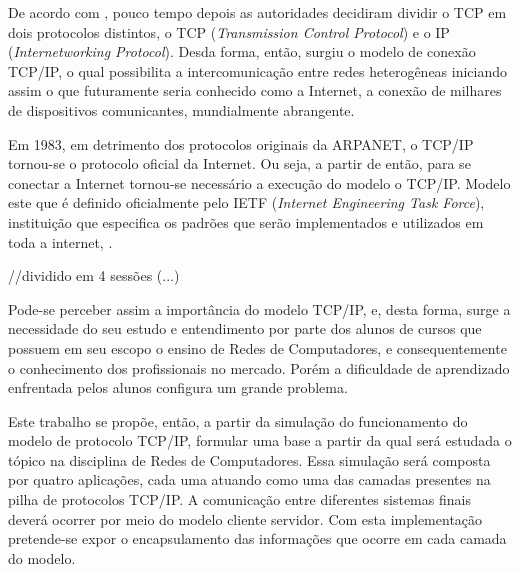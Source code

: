 De acordo com \cite{Forouzan}, pouco tempo depois as autoridades decidiram dividir o TCP em dois protocolos distintos, o TCP (\textit{Transmission Control Protocol}) e o IP (\textit{Internetworking Protocol}). Desda forma, então, surgiu o modelo de conexão TCP/IP, o qual possibilita a intercomunicação entre redes heterogêneas iniciando assim o que futuramente seria conhecido como a Internet, a conexão de milhares de dispositivos comunicantes, mundialmente abrangente.

Em 1983, em detrimento dos protocolos originais da ARPANET, o TCP/IP tornou-se o protocolo oficial da Internet. Ou seja, a partir de então, para se conectar a Internet tornou-se necessário a execução do modelo o TCP/IP. Modelo este que é definido oficialmente pelo IETF (\textit{Internet Engineering Task Force}), instituição que especifica os padrões que serão implementados e utilizados em toda a internet, \cite{RFC1180}.

//dividido em 4 sessões (...)


Pode-se perceber assim a importância do modelo TCP/IP, e, desta forma, surge a necessidade do seu estudo e entendimento por parte dos alunos de cursos que possuem em seu escopo o ensino de Redes de Computadores, e consequentemente o conhecimento dos profissionais no mercado. Porém a dificuldade de aprendizado enfrentada pelos alunos configura um grande problema.

Este trabalho se propõe, então, a partir da simulação do funcionamento do modelo de protocolo TCP/IP, formular uma base a partir da qual será estudada o t\'opico na disciplina de Redes de Computadores. Essa simulação será composta por quatro aplicações, cada uma atuando como uma das camadas presentes na pilha de protocolos TCP/IP. A comunicação entre diferentes sistemas finais deverá ocorrer por meio do modelo cliente servidor. Com esta implementação pretende-se expor o encapsulamento das informações que ocorre em cada camada do modelo.